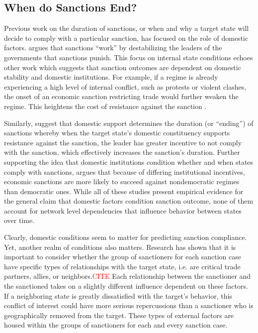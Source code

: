 \subsection*{When do Sanctions End?}
\label{lit}

Previous work on the duration of sanctions, or when and why a target state will decide to comply with a particular sanction, has focused on the role of domestic factors. \cite{marinov2005} argues that sanctions ``work'' by destabilizing the leaders of the governments that sanctions punish. This focus on internal state conditions echoes other work which suggests that sanction outcomes are dependent on domestic stability and domestic institutions. For example, if a regime is already experiencing a high level of internal conflict, such as protests or violent clashes, the onset of an economic sanction restricting trade would further weaken the regime. This heightens the cost of resistance against the sanction \citep{dashti1997}. 

Similarly, \citep{dorussen2001} suggest that domestic support determines the duration (or ``ending'') of sanctions whereby when the target state's domestic constituency supports resistance against the sanction, the leader has greater incentive to not comply with the sanction, which effectively increases the sanction's duration. Further supporting the idea that domestic institutions condition whether and when states comply with sanctions, \cite{lektzian2007} argues that because of differing institutional incentives, economic sanctions are more likely to succeed against nondemocratic regimes than democratic ones. While all of these studies present empirical evidence for the general claim that domestic factors condition sanction outcome, none of them account for network level dependencies that influence behavior between states over time. 

Clearly, domestic conditions seem to matter for predicting sanction compliance. Yet, another realm of conditions also matters. Research has shown that it is important to consider whether the group of sanctioners for each sanction case have specific types of relationships with the target state, i.e. are critical trade partners, allies, or neighbors.\textcolor{red}{CITE} Each relationship between the sanctioner and the sanctioned takes on a slightly different influence dependent on these factors. If a neighboring state is greatly dissatisfied with the target's behavior, this conflict of interest could have more serious repercussions than a sanctioner who is geographically removed from the target. These types of external factors are housed within the groups of sanctioners for each and every sanction case. 

